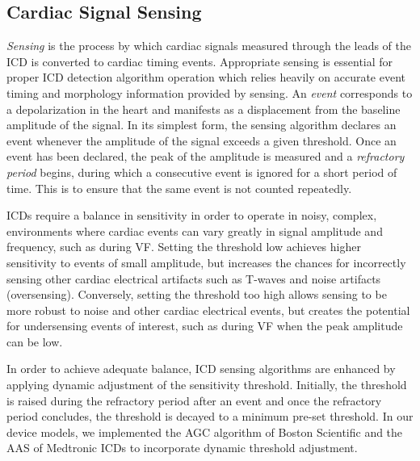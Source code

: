 \subsection{Cardiac Signal Sensing}
\label{sec:sensing}

\emph{Sensing} is the process by which cardiac signals measured through the leads of the ICD is converted to cardiac timing events.
Appropriate sensing is essential for proper ICD detection algorithm operation which relies heavily on accurate event timing and morphology information provided by sensing. 
An \emph{event} corresponds to a depolarization in the heart and manifests as a displacement from the baseline amplitude of the signal.
In its simplest form, the sensing algorithm declares an event whenever the amplitude of the signal exceeds a given threshold.
Once an event has been declared, the peak of the amplitude is measured and a \emph{refractory period} begins, during which a consecutive event is ignored for a short period of time. 
This is to ensure that the same event is not counted repeatedly.

ICDs require a balance in sensitivity in order to operate in noisy, complex, environments where cardiac events can vary greatly in signal amplitude and frequency, such as during VF. 
Setting the threshold low achieves higher sensitivity to events of small amplitude, but increases the chances for incorrectly sensing other cardiac electrical artifacts such as T-waves and noise artifacts (oversensing). 
Conversely, setting the threshold too high allows sensing to be more robust to noise and other cardiac electrical events, but creates the potential for undersensing events of interest, such as during VF when the peak amplitude can be low. 

In order to achieve adequate balance, ICD sensing algorithms are enhanced by applying dynamic adjustment of the sensitivity threshold.
Initially, the threshold is raised during the refractory period after an event and once the refractory period concludes, the threshold is decayed to a minimum pre-set threshold.
In our device models, we implemented the AGC algorithm of Boston Scientific and the AAS of Medtronic ICDs to incorporate dynamic threshold adjustment. 


